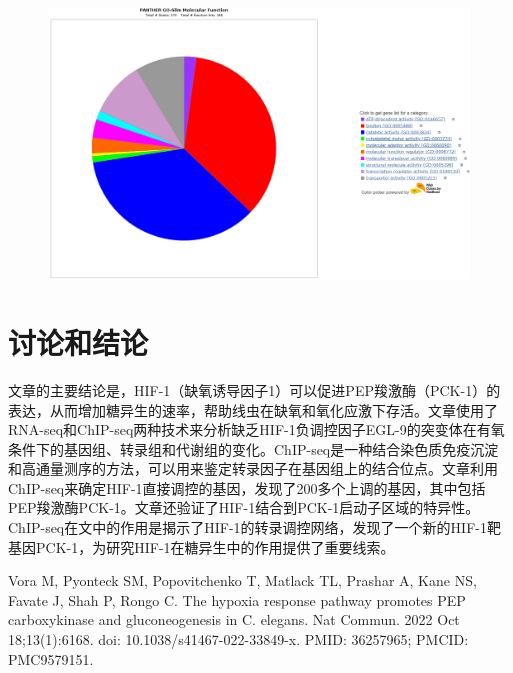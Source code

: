 \documentclass[UTF8]{ctexart}
\begin{document}
\begin{figure}[h]
	\centering
	\includegraphics[width=\textwidth]{img/GO_MolFun.png}
\end{figure}

\clearpage

\section{讨论和结论}

文章\cite{ref1}的主要结论是，HIF-1（缺氧诱导因子1）可以促进PEP羧激酶（PCK-1）的表达，从而增加糖异生的速率，帮助线虫在缺氧和氧化应激下存活。文章\cite{ref1}使用了RNA-seq和ChIP-seq两种技术来分析缺乏HIF-1负调控因子EGL-9的突变体在有氧条件下的基因组、转录组和代谢组的变化。ChIP-seq是一种结合染色质免疫沉淀和高通量测序的方法，可以用来鉴定转录因子在基因组上的结合位点。文章\cite{ref1}利用ChIP-seq来确定HIF-1直接调控的基因，发现了200多个上调的基因，其中包括PEP羧激酶PCK-1。文章\cite{ref1}还验证了HIF-1结合到PCK-1启动子区域的特异性。ChIP-seq在文中\cite{ref1}的作用是揭示了HIF-1的转录调控网络，发现了一个新的HIF-1靶基因PCK-1，为研究HIF-1在糖异生中的作用提供了重要线索。

\clearpage

\begin{thebibliography}{99}

	 Vora M, Pyonteck SM, Popovitchenko T, Matlack TL, Prashar A, Kane NS, Favate J, Shah P, Rongo C. The hypoxia response pathway promotes PEP carboxykinase and gluconeogenesis in C. elegans. Nat Commun. 2022 Oct 18;13(1):6168. doi: 10.1038/s41467-022-33849-x. PMID: 36257965; PMCID: PMC9579151.

\end{thebibliography}
\end{document}
